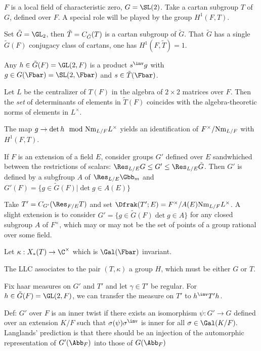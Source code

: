 



$F$ is a local field of characteristic zero, $G=\SL(2)$. Take a cartan subgroup $T$ of $G$, defined over $F$.  A special role will be played by the group $H^1(F,T)$.

Set $\tilde{G}=\GL_2$, then $\Tilde{T} = C_{\tilde{G}} (T)$ is a cartan subgroup of $\tilde{G}$. That $\tilde{G}$ has a single $\tilde{G}(F)$ conjugacy class of cartans, one has $H^1(F,\tilde{T}) = 1.$

Any $h\in \tilde{G}(F)=\GL(2,F)$ is a product $s^\inv g$ with $g\in G(\Fbar)=\SL(2,\Fbar)$ and $s \in \tilde{T}(\Fbar)$.

Let $L$ be the centralizer of $T(F)$ in the algebra of $2\times 2$ matrices over $F$. Then the \emph{set} of determinants of elements in $\tilde{T}(F)$ coincides with the algebra-theoretic norms of elements in $L^\times$.

The map $g \to \det h \mod \Nm{L/F} L^\times$ yields an identification of $F^\times / {\rm Nm}_{L/F}$ with $H^1(F,T)$.

If $F$ is an extension of a field $E$, consider groups $G'$ defined over $E$ sandwhiched between the restrictions of scalars: $\Res_{L/E}G \leq G' \leq \Res_{L/E}\tilde{G}$. Then $G'$ is defined by a subgfroup $A$ of $\Res_{L/E} \Gbb_m$ and $G'(F) = \{ g \in \tilde{G}(F) \vert \det g \in A (E)\}$

Take $T' = C_{G'}(\Res_{F/E}T)$ and set $\Dfrak(T';E) = F^\times / A(E)\Nm{L/F}L^\times $. A slight extension is to consider $G' = \{ g \in \tilde{G} (F) \det g \in A\}$ for any closed subgroup $A$ of $F^\times$, which may or may not be the set of points of a group rational over some field.

Let $\kappa : X_* (T) \to \C^\times $ which is $\Gal(\Fbar)$ invariant.

The LLC associates to the pair $(T,\kappa)$ a group $H$, which must be either $G$ or $T$.

Fix haar measures on $G'$ and $T'$ and let $\gamma \in T'$ be regular. For $ h \in \tilde{G}(F)=\GL (2,F) $, we can transfer the measure on $T'$ to $h^\inv T' h $.

Def: $G'$ over $F$ is an inner twist if there exists an isomorphism $\psi: G' \to G$ defined over an extension $K/F$ such that $\sigma(\psi) \sigma ^\inv$ is inner for all $\sigma \in \Gal(K/F).$ Langlands' prediction is that there should be an injection of the automorphic representation of $G'(\Abb_F)$ into those of $G(\Abb_F)$


